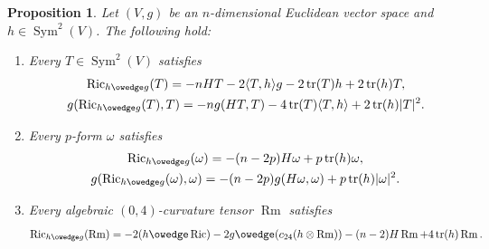 \documentclass[10pt,a4paper]{amsart}
\numberwithin{equation}{section}
\newtheorem{Proposition}[Theorem]{Proposition}
{ \theoremstyle{definition}
\newtheorem{Remark}[Theorem]{Remark} }
\newcommand{\Ric} {\operatorname{Ric}}
\newcommand{ \tr } {\operatorname{tr}}
\newcommand{\Rm} {\operatorname{Rm}}
\newcommand{ \Sym } {\operatorname{Sym}}
\begin{document}
\begin{Proposition}\label{WeightedCurvatureTerm}
Let $(V,g)$ be an $n$-dimensional Euclidean vector space and $h \in \Sym^2(V)$. The following hold:
\begin{enumerate}\itemsep=0pt
\item[$1.$] Every $T \in \operatorname{Sym}^2(V)$ satisfies
\begin{gather*}
\Ric_{h \owedge g}(T)   = - n HT - 2 \langle T,h \rangle g-2 \tr(T)h + 2 \tr(h) T , \\
g(\Ric_{h \owedge g}(T),T)   = - n g(HT,T) -4 \tr(T) \langle T, h \rangle + 2 \tr(h) |T|^2.
\end{gather*}
\item[$2.$] Every $p$-form $\omega$ satisfies
\begin{gather*}
\Ric_{h \owedge g}(\omega)   = - (n-2p) H \omega + p \tr(h) \omega, \\
g(\Ric_{h \owedge g}(\omega), \omega)   = - (n-2p) g(H \omega, \omega) + p \tr(h) |\omega|^2.
\end{gather*}
\item[$3.$] Every algebraic $(0,4)$-curvature tensor $\Rm$ satisfies
\begin{gather*}
\Ric_{h \owedge g}(\Rm)  = -2  ( h \owedge \Ric  ) -2 g \owedge ( c_{24} ( h \otimes \Rm  ) ) -(n-2) H \Rm + 4 \tr(h) \Rm.
\end{gather*}
\end{enumerate}
\end{Proposition}
\end{document}
